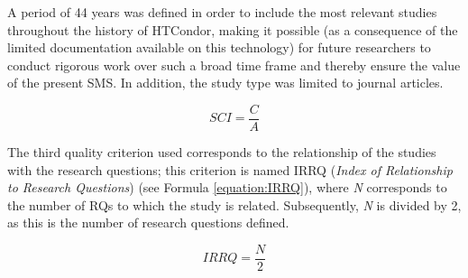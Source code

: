 A period of 44 years was defined in order to include the most relevant studies throughout the history of HTCondor, making it possible (as a consequence of the limited documentation available on this technology) for future researchers to conduct rigorous work over such a broad time frame and thereby ensure the value of the present SMS. In addition, the study type was limited to journal articles.

\begin{equation}
	\label{equation:SCI}
	SCI = \frac{C}{A}
\end{equation}

The third quality criterion used corresponds to the relationship of the studies with the research questions; this criterion is named IRRQ (\textit{Index of Relationship to Research Questions}) (see Formula \ref{equation:IRRQ}), where \textit{N} corresponds to the number of RQs to which the study is related. Subsequently, \textit{N} is divided by 2, as this is the number of research questions defined.

\begin{equation}
	\label{equation:IRRQ}
	IRRQ = \frac{N}{2}
\end{equation}

